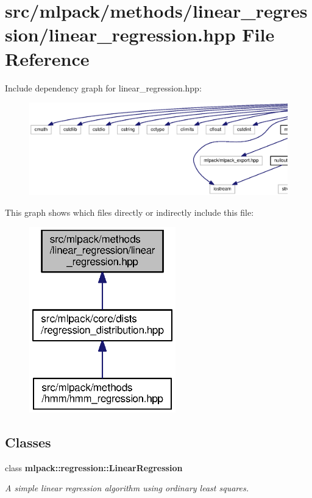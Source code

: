 \section{src/mlpack/methods/linear\+\_\+regression/linear\+\_\+regression.hpp File Reference}
\label{linear__regression_8hpp}
Include dependency graph for linear\+\_\+regression.\+hpp\+:
\nopagebreak
\begin{figure}[H]
\begin{center}
\leavevmode
\includegraphics[width=350pt]{linear__regression_8hpp__incl}
\end{center}
\end{figure}
This graph shows which files directly or indirectly include this file\+:
\nopagebreak
\begin{figure}[H]
\begin{center}
\leavevmode
\includegraphics[width=180pt]{linear__regression_8hpp__dep__incl}
\end{center}
\end{figure}
\subsection*{Classes}
\begin{DoxyCompactItemize}
\item 
class {\bf mlpack\+::regression\+::\+Linear\+Regression}
\begin{DoxyCompactList}\small\item\em A simple linear regression algorithm using ordinary least squares. \end{DoxyCompactList}\end{DoxyCompactItemize}

